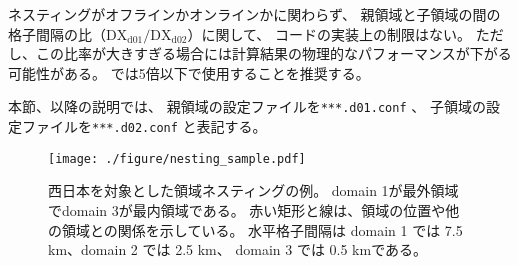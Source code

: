 ネスティングがオフラインかオンラインかに関わらず、
親領域と子領域の間の格子間隔の比（$\mathrm{DX}_{\mathrm{d01}}/\mathrm{DX}_{\mathrm{d02}}$）に関して、
コードの実装上の制限はない。
ただし、この比率が大きすぎる場合には計算結果の物理的なパフォーマンスが下がる可能性がある。
\scalerm では5倍以下で使用することを推奨する。

本節、以降の説明では、
親領域の設定ファイルを\verb|***.d01.conf| 、
子領域の設定ファイルを\verb|***.d02.conf| と表記する。

\begin{figure}[t]
\begin{center}
  \texttt{[image: ./figure/nesting\_sample.pdf]}\\
  \caption{西日本を対象とした領域ネスティングの例。
    domain 1が最外領域でdomain 3が最内領域である。
    赤い矩形と線は、領域の位置や他の領域との関係を示している。
    水平格子間隔は domain 1 では 7.5 km、domain 2 では 2.5 km、
    domain 3 では 0.5 kmである。}
  \label{fig_nestsample}
\end{center}
\end{figure}
